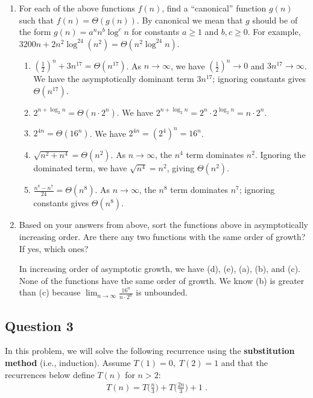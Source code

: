 \begin{enumerate}
    \item For each of the above functions $f(n)$, find a ``canonical'' function $g(n)$ such that $f(n) = \Theta(g(n))$. By canonical we mean that $g$ should be of the form $g(n) = a^n n^b \log^c n$ for constants $a\ge 1$ and $b,c\ge 0$. For example,  $3200n + 2n^2 \log^{24} (n^2) = \Theta(n^2\log^{24} n)$.

\begin{solution}
\begin{enumerate}
\item$\left(\frac{1}{2}\right)^n+3n^{17}=\Theta(n^{17})$. As $n\to\infty$, we have $\left(\frac{1}{2}\right)^n\to 0$ and $3n^{17}\to\infty$. We have the asymptotically dominant term $3n^{17}$; ignoring constants gives $\Theta(n^{17})$.
\item$2^{n+\log_2{n}}=\Theta(n\cdot2^n)$. We have $2^{n+\log_2{n}}=2^n\cdot2^{\log_2{n}}=n\cdot 2^n$.
\item$2^{4n}=\Theta(16^n)$. We have $2^{4n}=\left(2^4\right)^n=16^n$.
\item$\sqrt{n^2+n^4}=\Theta(n^2)$. As $n\to\infty$, the $n^4$ term dominates $n^2$. Ignoring the dominated term, we have $\sqrt{n^4}=n^2$, giving $\Theta(n^2)$.
\item$\frac{n^8-n^7}{24}=\Theta(n^8)$. As $n\to\infty$, the $n^8$ term dominates $n^7$; ignoring constants gives $\Theta(n^8)$.
\end{enumerate}
\end{solution}
\item Based on your answers from above, sort the functions above in asymptotically increasing order. Are there any two functions with the same order of growth? If yes, which ones?
\begin{solution}
In increasing order of asymptotic growth, we have (d), (e), (a), (b), and (c). None of the functions have the same order of growth. We know (b) is greater than (c) because $\lim_{n\to\infty}{\frac{16^n}{n\cdot 2^n}}$ is unbounded.
\end{solution}
\end{enumerate}
\newpage
\subsection*{Question 3}
\label{question:3}
In this problem, we will solve the following recurrence using the \textbf{substitution method} (i.e., induction). Assume $T(1)=0,\; T(2)=1$ and that the recurrences below define $T(n)$ for $n>2$:
\begin{align}
T(n) = T\Big(\frac{n}{3}\Big)+T\Big(\frac{2n}{3}\Big)+1\;. \label{eq:recurrence}
\end{align}

